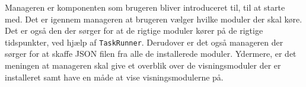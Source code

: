 Manageren er komponenten som brugeren bliver introduceret til, til at starte med.
Det er igennem manageren at brugeren vælger hvilke moduler der skal køre.
Det er også den der sørger for at de rigtige moduler kører på de rigtige tidspunkter, ved hjælp af \texttt{TaskRunner}.
Derudover er det også manageren der sørger for at skaffe JSON filen fra alle de installerede moduler.
Ydermere, er det meningen at manageren skal give et overblik over de visningsmoduler der er installeret samt have en måde at vise visningsmodulerne på.